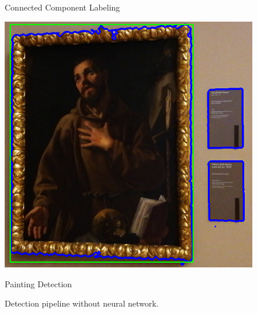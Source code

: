 \begin{figure}[hb!]
        \caption*{Connected Component Labeling}\label{fig:ccl}
      \endminipage\hfill
        \includegraphics[width=\linewidth]{pictures/painting_detection/6-bbox.PNG}
        \caption*{Painting Detection}\label{fig:bbox}
      \endminipage
      \caption{Detection pipeline without neural network.} \label{fig:pipeline_detection}
  \end{figure}
